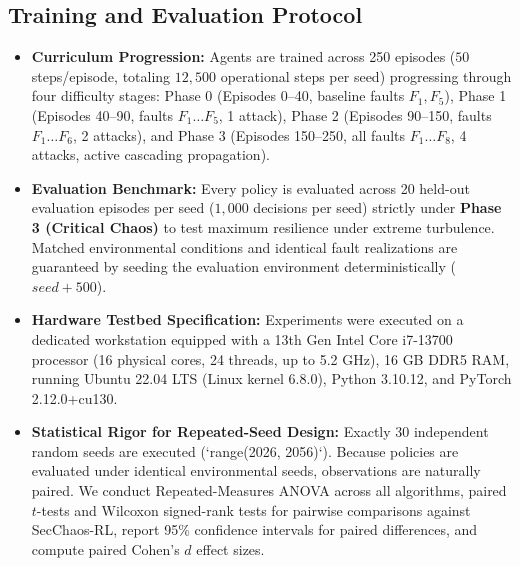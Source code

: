 \documentclass[11pt,a4paper]{article}
\begin{document}
\subsection{Training and Evaluation Protocol}
\begin{itemize}
    \item \textbf{Curriculum Progression:} Agents are trained across 250 episodes ($50$ steps/episode, totaling $12,500$ operational steps per seed) progressing through four difficulty stages: Phase 0 (Episodes 0–40, baseline faults $F_1, F_5$), Phase 1 (Episodes 40–90, faults $F_1 \dots F_5$, 1 attack), Phase 2 (Episodes 90–150, faults $F_1 \dots F_6$, 2 attacks), and Phase 3 (Episodes 150–250, all faults $F_1 \dots F_8$, 4 attacks, active cascading propagation).
    \item \textbf{Evaluation Benchmark:} Every policy is evaluated across 20 held-out evaluation episodes per seed ($1,000$ decisions per seed) strictly under \textbf{Phase 3 (Critical Chaos)} to test maximum resilience under extreme turbulence. Matched environmental conditions and identical fault realizations are guaranteed by seeding the evaluation environment deterministically ($seed + 500$).
    \item \textbf{Hardware Testbed Specification:} Experiments were executed on a dedicated workstation equipped with a 13th Gen Intel Core i7-13700 processor (16 physical cores, 24 threads, up to 5.2 GHz), 16 GB DDR5 RAM, running Ubuntu 22.04 LTS (Linux kernel 6.8.0), Python 3.10.12, and PyTorch 2.12.0+cu130.
    \item \textbf{Statistical Rigor for Repeated-Seed Design:} Exactly 30 independent random seeds are executed (`range(2026, 2056)`). Because policies are evaluated under identical environmental seeds, observations are naturally paired. We conduct Repeated-Measures ANOVA across all algorithms, paired $t$-tests and Wilcoxon signed-rank tests for pairwise comparisons against SecChaos-RL, report 95\% confidence intervals for paired differences, and compute paired Cohen's $d$ effect sizes.
\end{itemize}
\end{document}
